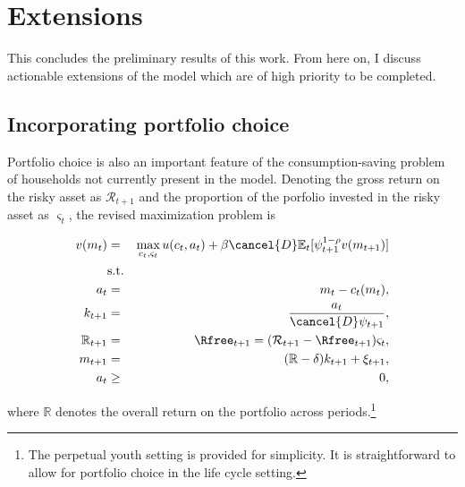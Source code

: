 \documentclass[\econtexRoot/Chp1proposal]{subfiles}
\begin{document}
\hypertarget{extensions}{}
\section{Extensions}\notinsubfile{\label{sec:extensions}}

This concludes the preliminary results of this work. From here on, I discuss actionable extensions of the model which are of high priority to be completed.

\subsection{Incorporating portfolio choice}

\par Portfolio choice is also an important feature of the consumption-saving problem of households not currently present in the model. Denoting the gross return on the risky asset as $\mathcal{R}_{t+1}$ and the proportion of the porfolio invested in the risky asset as $\varsigma_t$, the revised maximization problem is

\begin{eqnarray*}
  v(m_t) &=& \max_{c_t, \varsigma_t} u(c_t, a_t) + \beta \cancel{D} \mathbb{E}_{t}[\psi_{t+1}^{1-\rho}v(m_{t+1})] \\
  &\text{s.t.}& \\
  a_t &=& m_t - c_t(m_t), \\
  k_{t+1} &=& \frac{a_t}{\cancel{D}\psi_{t+1}}, \\
  \mathbb{R}_{t+1} &=& \Rfree_{t+1} = (\mathcal{R}_{t+1} - \Rfree_{t+1})\varsigma_t, \\
  m_{t+1} &=& (\mathbb{R} - \delta)k_{t+1} + \xi_{t+1}, \\
  a_t &\geq& 0,
\end{eqnarray*}

\par where $\mathbb{R}$ denotes the overall return on the portfolio across periods.\footnote{The perpetual youth setting is provided for simplicity. It is straightforward to allow for portfolio choice in the life cycle setting.}

\end{document}
